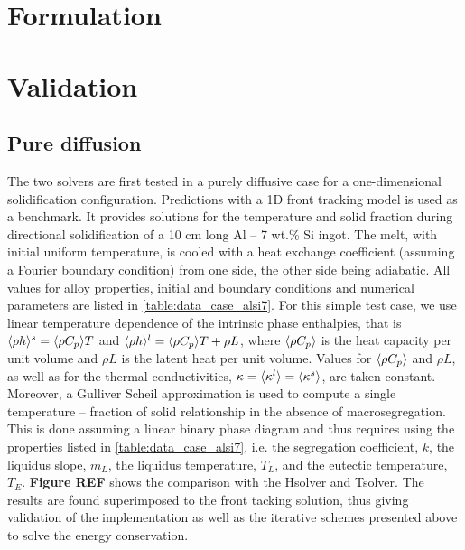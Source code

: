 \section{Formulation}

\section{Validation}

\subsection{Pure diffusion}
The two solvers are first tested in a purely diffusive case for a one-dimensional solidification configuration. 
Predictions with a 1D front tracking model \citep{gandin_constrained_2000} is used as a benchmark. It provides 
solutions for the temperature and solid fraction during directional solidification of a 10 cm long Al – 7 wt.\% Si 
ingot. The melt, with initial uniform temperature, is cooled with a heat exchange coefficient (assuming a Fourier 
boundary condition) from one side, the other side being adiabatic. All values for alloy properties, initial and 
boundary conditions and numerical parameters are listed in \autoref{table:data_case_alsi7}. For this simple test case, 
we use linear temperature dependence of the intrinsic phase enthalpies, that is $\langle  \rho h  \rangle^s= \langle  \rho C_p  \rangle T$ and $\langle  \rho h  \rangle^l= \langle  \rho C_p  \rangle T + \rho L$, 
where $\langle  \rho C_p  \rangle$ is the heat capacity per unit volume and $\rho L$ is the latent heat per unit volume. Values for $\langle  \rho C_p  \rangle$ 
and $\rho L$, as well as for the thermal conductivities, $\kappa = \langle \kappa^l \rangle = \langle \kappa^s \rangle$, are taken constant. Moreover, a 
Gulliver Scheil approximation is used to compute a single temperature – fraction of solid relationship in the 
absence of macrosegregation. This is done assuming a linear binary phase diagram and thus requires using the 
properties listed in \autoref{table:data_case_alsi7}, i.e. the segregation coefficient, $k$, the liquidus slope, $m_L$, the 
liquidus temperature, $T_L$, and the eutectic temperature, $T_E$. \textbf{Figure REF} shows the comparison with 
the Hsolver and Tsolver. The results are found superimposed to the front tacking solution, thus giving validation 
of the implementation as well as the iterative schemes presented above to solve the energy conservation.

